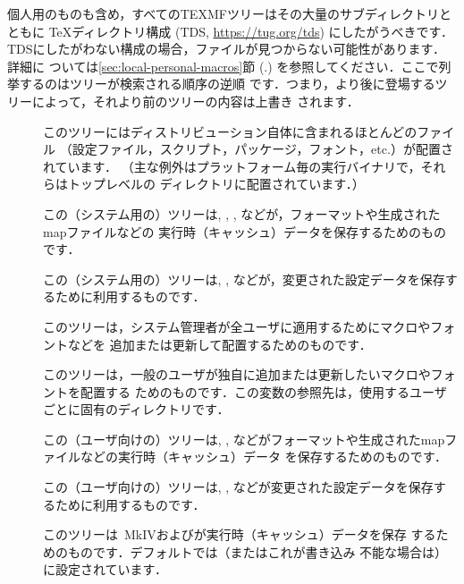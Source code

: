 \documentclass[uplatex,dvipdfmx,tombow]{jsarticle}
\begin{document}
個人用のものも含め，すべてのTEXMFツリーはその大量のサブディレクトリとともに
\TeX ディレクトリ構成 (TDS, \url{https://tug.org/tds}) にしたがうべきです．
TDSにしたがわない構成の場合，ファイルが見つからない可能性があります．詳細に
ついては\ref{sec:local-personal-macros}節 (\p.\pageref{sec:local-personal-%
macros}) を参照してください．ここで列挙するのはツリーが検索される順序の逆順
です．つまり，より後に登場するツリーによって，それより前のツリーの内容は上書き
されます．
%
\begin{description}
\item[]
このツリーには\TL ディストリビューション自体に含まれるほとんどのファイル
（設定ファイル，スクリプト，パッケージ，フォント，etc.）が配置されています．
（主な例外はプラットフォーム毎の実行バイナリで，それらはトップレベルの
ディレクトリに配置されています．）

\item[]
この（システム用の）ツリーは, , , などが，フォーマットや生成されたmapファイルなどの
実行時（キャッシュ）データを保存するためのものです．

\item[]
この（システム用の）ツリーは, , などが，変更された設定データを保存するために利用するものです．

\item[]
このツリーは，システム管理者が全ユーザに適用するためにマクロやフォントなどを
追加または更新して配置するためのものです．

\item[]
このツリーは，一般のユーザが独自に追加または更新したいマクロやフォントを配置する
ためのものです．この変数の参照先は，使用するユーザごとに固有のディレクトリです．

\item[]
この（ユーザ向けの）ツリーは, , などがフォーマットや生成されたmapファイルなどの実行時（キャッシュ）データ
を保存するためのものです．

\item[]
この（ユーザ向けの）ツリーは, , などが変更された設定データを保存するために利用するものです．

\item[]
このツリーは\ConTeXt\ MkIVおよび\LuaLaTeX が実行時（キャッシュ）データを保存
するためのものです．デフォルトでは（またはこれが書き込み
不能な場合は）に設定されています．
\end{description}
\end{document}
